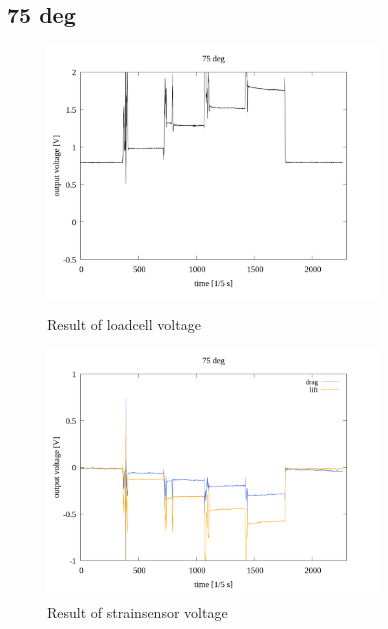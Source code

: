 \documentclass[twocolumn,a4j]{jsarticle}
\begin{document}
\subsection{75 deg}
\begin{figure}[htbp]
    \footnotesize
    \begin{center}
        \includegraphics[width=88mm]{../images/voltage-time/75_loadcell.png}
        \caption{Result of loadcell voltage}
        \includegraphics[width=88mm]{../images/voltage-time/75_strainsensor.png}
        \caption{Result of strainsensor voltage}
    \end{center}
\end{figure}

\newpage
\end{document}

